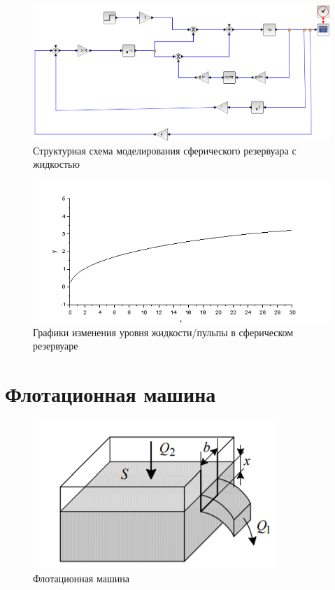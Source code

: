 \documentclass[a4paper, 12pt]{article}
\begin{document}
\begin{figure}[h!]
	\centering
	\includegraphics[scale=0.5]{scheme3}
	\caption{Структурная схема моделирования сферического резервуара с жидкостью}
	\label{p:сферический_резервуар_схема}
\end{figure}


\begin{figure}[h!]
	\centering
	\includegraphics[scale=0.8]{graph3-1}
	\caption{Графики изменения уровня жидкости/пульпы в сферическом резервуаре }
	\label{p:сферический_резервуар_графики}
\end{figure}

\newpage

\section{Флотационная машина}
 
\begin{figure}[h!]
	\centering
	\includegraphics[scale=0.8]{example_4}
	\caption{ Флотационная машина  }
	\label{p:Флотационная_машина}
\end{figure}
\end{document}
